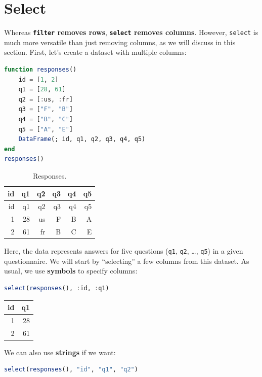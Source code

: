 \documentclass[
  notoc %
]{tufte-book}
\newcommand{\passthrough}[1]{#1}
\begin{document}
\hypertarget{sec:select}{%
\section{Select}\label{sec:select}}

Whereas \textbf{\passthrough{\lstinline!filter!} removes rows},
\textbf{\passthrough{\lstinline!select!} removes columns}. However,
\passthrough{\lstinline!select!} is much more versatile than just
removing columns, as we will discuss in this section. First, let's
create a dataset with multiple columns:

\begin{lstlisting}[language=Julia]
function responses()
    id = [1, 2]
    q1 = [28, 61]
    q2 = [:us, :fr]
    q3 = ["F", "B"]
    q4 = ["B", "C"]
    q5 = ["A", "E"]
    DataFrame(; id, q1, q2, q3, q4, q5)
end
responses()
\end{lstlisting}

\hypertarget{tbl:responses}{}
\begin{longtable}[]{@{}rrrrrr@{}}
\caption{\label{tbl:responses}Responses.}\tabularnewline
\toprule
id & q1 & q2 & q3 & q4 & q5 \\
\midrule
\endfirsthead
\toprule
id & q1 & q2 & q3 & q4 & q5 \\
\midrule
\endhead
1 & 28 & us & F & B & A \\
2 & 61 & fr & B & C & E \\
\bottomrule
\end{longtable}

Here, the data represents answers for five questions
(\passthrough{\lstinline!q1!}, \passthrough{\lstinline!q2!}, \ldots,
\passthrough{\lstinline!q5!}) in a given questionnaire. We will start by
``selecting'' a few columns from this dataset. As usual, we use
\textbf{symbols} to specify columns:

\begin{lstlisting}[language=Julia]
select(responses(), :id, :q1)
\end{lstlisting}

\begin{longtable}[]{@{}rr@{}}
\toprule
id & q1 \\
\midrule
\endhead
1 & 28 \\
2 & 61 \\
\bottomrule
\end{longtable}

We can also use \textbf{strings} if we want:

\begin{lstlisting}[language=Julia]
select(responses(), "id", "q1", "q2")
\end{lstlisting}
\end{document}
